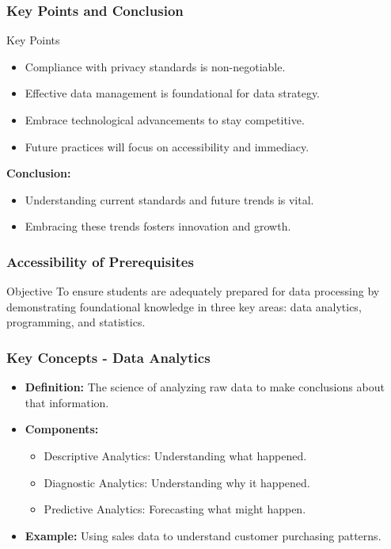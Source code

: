 \documentclass[aspectratio=169]{beamer}
\begin{document}
\begin{frame}[fragile]
    \frametitle{Key Points and Conclusion}
    \begin{block}{Key Points}
        \begin{itemize}
            \item Compliance with privacy standards is non-negotiable.
            \item Effective data management is foundational for data strategy.
            \item Embrace technological advancements to stay competitive.
            \item Future practices will focus on accessibility and immediacy.
        \end{itemize}
    \end{block}

    \textbf{Conclusion:} 
    \begin{itemize}
        \item Understanding current standards and future trends is vital.
        \item Embracing these trends fosters innovation and growth.
    \end{itemize}
\end{frame}

\begin{frame}[fragile]
    \frametitle{Accessibility of Prerequisites}
    \begin{block}{Objective}
        To ensure students are adequately prepared for data processing by demonstrating foundational knowledge in three key areas: data analytics, programming, and statistics.
    \end{block}
\end{frame}

\begin{frame}[fragile]
    \frametitle{Key Concepts - Data Analytics}
    \begin{itemize}
        \item \textbf{Definition:} The science of analyzing raw data to make conclusions about that information.
        \item \textbf{Components:}
        \begin{itemize}
            \item Descriptive Analytics: Understanding what happened.
            \item Diagnostic Analytics: Understanding why it happened.
            \item Predictive Analytics: Forecasting what might happen.
        \end{itemize}
        \item \textbf{Example:} Using sales data to understand customer purchasing patterns.
    \end{itemize}
\end{frame}
\end{document}
